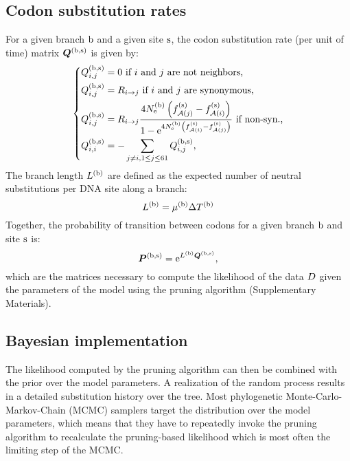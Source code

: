 \subsection{Codon \gls{substitution} rates}
For a given branch $\text{b}$ and a given site $\text{s}$, the \gls{codon} \gls{substitution} rate (per unit of time) matrix $\bm{Q}^{(\text{b}, \text{s})}$ is given by:
\begin{equation}
\label{eq:subrates}
\begin{dcases}
\submatrix\branchsiteexp_{\itoj} = 0\text{ if $\ci$ and $\cj$ are not neighbors,} \\
\submatrix\branchsiteexp_{\itoj} = \mutmatrix_{\nucitoj}\text{ if $\ci$ and $\cj$ are synonymous,} \\
\submatrix\branchsiteexp_{\itoj} = \mutmatrix_{\nucitoj} \dfrac{4\Ne\branchexp \left({\fitj\siteexp - \fiti\siteexp}\right)}{{1 - \e^{4\Ne\branchexp\left({\fiti\siteexp - \fitj\siteexp}\right)} }} \text{ if non-syn.,}\\
\submatrix\branchsiteexp_{\ci, \ci} = - \sum\limits_{ \cj \neq \ci, \jSetCodon} \submatrix\branchsiteexp_{\itoj},
\end{dcases}
\end{equation}
The branch length $L^{(\text{b})}$ are defined as the expected number of \gls{neutral} \glspl{substitution} per \acrshort{DNA} site along a branch:
\begin{equation}
\label{eq:branchlength}
\branchlength\branchexp = \mu\branchexp \branchtime\branchexp
\end{equation}
Together, the probability of {transition} between \glspl{codon} for a given branch $\text{b}$ and site $\text{s}$ is:
\begin{equation}
\label{eq:Probmatrix}
\Probmatrix\branchsiteexp = \e^{\branchlength\branchexp \Submatrix\branchsiteexp},
\end{equation}
which are the matrices necessary to compute the \gls{likelihood} of the data $D$ given the parameters of the model using the pruning algorithm (Supplementary Materials).

\subsection{Bayesian implementation}
\label{sec:Bayesian}
The \gls{likelihood} computed by the pruning algorithm can then be combined with the \gls{prior} over the model parameters.
A realization of the random process results in a detailed \gls{substitution} history over the tree.
Most phylogenetic Monte-Carlo-Markov-Chain (\acrshort{MCMC}) samplers target the distribution over the model parameters, which means that they have to repeatedly invoke the pruning algorithm to recalculate
the pruning-based \gls{likelihood} which is most often the limiting step of the \acrshort{MCMC}.

